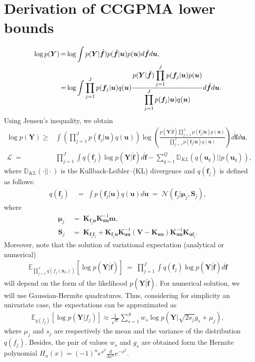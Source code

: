 \documentclass[9pt]{article}
\providecommand{\ve}[1]{{\bm{#1}}}%
\providecommand{\mat}[1]{{\bm{#1}}} %
\DeclareMathOperator{\igual}{\!\,=\!\,}
\providecommand{\ve}[1]{{\mathbf{#1}}}
\providecommand{\mat}[1]{{\mathbf{#1}}}
\newcommand{\gauss}{\mathcal{N}} %
\begin{document}
\section{Derivation of CCGPMA lower bounds}
\begin{align}
\notag\log p(\mat{Y}) &\igual\log \int p(\mat{Y}|\hat{\ve{f}})p(\hat{\ve{f}}|\ve{u})p(\ve{u})d\hat{\ve{f}} d\ve{u},\\
&\igual\log \int \prod_{j=1}^{J}p(\ve{f}_j|\ve{u})q(\ve{u}) \displaystyle\frac{p(\mat{Y}|\hat{\ve{f}})\displaystyle\prod_{j=1}^{J}p(\ve{f}_j|\ve{u})p(\ve{u})}{\displaystyle\prod_{j=1}^{J}p(\ve{f}_j|\ve{u})q(\ve{u})}d\hat{\ve{f}} d\ve{u}.
\end{align}
Using Jensen's inequality, we obtain
\begin{align}
 \log p(\mat{Y}) \ge &   \int \left(\prod_{j=1}^{J}p(\ve{f}_j|\ve{u})q(\ve{u})\right)\log\left(\frac{p(\mat{Y}|\hat{\ve{f}})\displaystyle\prod_{j=1}^{J}p(\ve{f}_j|\ve{u})p(\ve{u})}{\displaystyle\prod_{j=1}^{J}p(\ve{f}_j|\ve{u})q(\ve{u})}\right)d\hat{\ve{f}} d\ve{u},\\ 
\mathcal{L} \igual &  \prod_{j=1}^{J}\int q(\ve{f}_j)\log p(\mat{Y}|\hat{\ve{f}})d\hat{\ve{f}} -  \sum_{q=1}^{Q}\mathbb{D}_{KL}(q(\ve{u}_q)||p(\ve{u}_q)),
\label{eq:LowBound}
\end{align}
where $\mathbb{D}_{KL}(\cdot||\cdot)$ is the Kullback-Leibler--(KL) divergence and $q(\ve{f}_j)$ is defined as follows:
\begin{align}
 q(\ve{f}_j) &\igual \int p(\ve{f}_j|\ve{u})q(\ve{u})d\ve{u} \igual \gauss(\ve{f}_j|\bm{\mu}_j,\mat{S}_j),
\end{align}
where
\begin{align}
     \bm{\mu}_j &\igual \mat{K}_{\ve{f}_j\ve{u}}\mat{K}_{\ve{u}\ve{u}}^{-1}\ve{m},\\
     \mat{S}_j &\igual \mat{K}_{\ve{f}_j\ve{f}_j}+\mat{K}_{\ve{f}_j\ve{u}}\mat{K}_{\ve{u}\ve{u}}^{-1}(\mat{V}-\mat{K}_{\ve{u}\ve{u}})\mat{K}_{\ve{u}\ve{u}}^{-1}\mat{K}_{\ve{u}\ve{f}_j}.
\end{align}
Moreover, note that the solution of variational expectation (analytical or numerical)
\begin{align}
    \mathbb{E}_{\prod\limits^J_{j=1}q(f_j(\ve{x}_n))}\left[\log p(\mat{Y}|\hat{\ve{f}})\right]\igual \prod_{j=1}^{J}\int q(\ve{f}_j)\log p(\mat{Y}|\hat{\ve{f}})d\hat{\ve{f}}
\end{align}
will depend on the form of the likelihood $p(\mat{Y}|\hat{\ve{f}})$. For numerical solution, we will use Gaussian-Hermite quadratures. Thus, considering for simplicity an univariate case, the expectations can be approximated as
\begin{align}
\mathbb{E}_{q({f}_j)}\left[\log p(\mat{Y}|{f}_j)\right] \approx \frac{1}{\sqrt{\pi}}\sum_{s=1}^{S}w_s\log p(\mat{Y}|\sqrt{2{s}_j}{g}_s + {\mu}_j),
\end{align}
where ${\mu}_j$ and ${s}_j$ are respectively the mean and the variance of the distribution $q({f}_j)$. Besides, the pair of values $w_s$ and ${g}_s$ are obtained form the Hermite polynomial $H_n(x) = (-1)^ne^{x^2}\frac{d}{dx^n}e^{-x^2}$.
\end{document}
